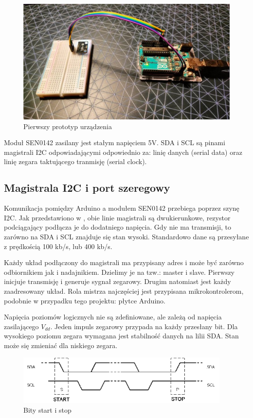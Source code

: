 \begin{figure}[H]
    \centering
    \includegraphics[width=\textwidth]{pictures/prototype.png}
    \caption{Pierwszy prototyp urządzenia}
    \label{sketch}
\end{figure}

Moduł SEN0142 zasilany jest stałym napięciem 5V. SDA i SCL są pinami magistrali I2C odpowiadającymi odpowiednio za: linię danych (serial data) oraz linię zegara taktującego tranmisję (serial clock).

\subsection{Magistrala I2C i port szeregowy}
Komunikacja pomiędzy Arduino a modułem SEN0142 przebiega poprzez szynę I2C. Jak przedstawiono w \cite{forbot}, obie linie magistrali są dwukierunkowe, rezystor podciągający podłącza je do dodatniego napięcia. Gdy nie ma transmisji, to zarówno na SDA i SCL znajduje się stan wysoki. Standardowo dane są przesyłane z prędkością 100 kb/s, lub 400 kb/s. 

Każdy układ podłączony do magistrali ma przypisany adres i może być zarówno odbiornikiem jak i nadajnikiem. Dzielimy je na tzw.: master i slave. Pierwszy inicjuje transmisję i generuje sygnał zegarowy. Drugim natomiast jest każdy zaadresowany układ. Rola mistrza najczęściej jest przypisana mikrokontrolerom, podobnie w przypadku tego projektu: płytce Arduino. 

Napięcia poziomów logicznych nie są zdefiniowane, ale zależą od napięcia zasilającego $V_{dd}$. Jeden impuls zegarowy przypada na każdy przesłany bit. Dla wysokiego poziomu zegara wymagana jest stabilność danych na lilii SDA. Stan może się zmieniać dla niskiego zegara.

\begin{figure}[H]
    \centering
    \includegraphics[width=0.95\textwidth]{pictures/ss.png}
    \caption{Bity start i stop \cite{forbot}}
    \label{fig:ss}
\end{figure}

